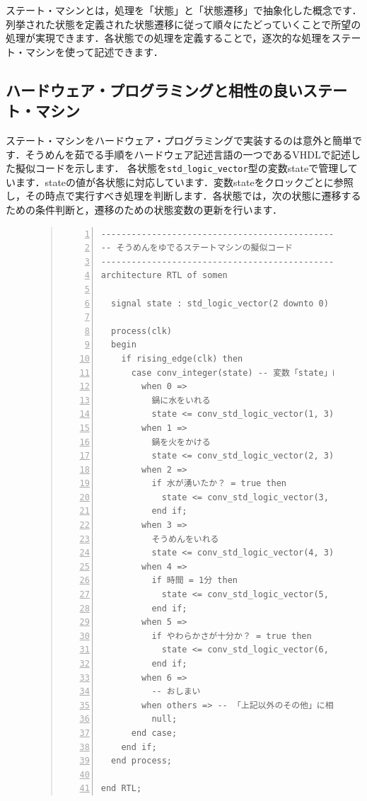 \documentclass[a4paper,dvipdfmx]{jsarticle}
\begin{document}
ステート・マシンとは，処理を「状態」と「状態遷移」で抽象化した概念です．列挙された状態を定義された状態遷移に従って順々にたどっていくことで所望の処理が実現できます．各状態での処理を定義することで，逐次的な処理をステート・マシンを使って記述できます．

\subsection{ハードウェア・プログラミングと相性の良いステート・マシン}
ステート・マシンをハードウェア・プログラミングで実装するのは意外と簡単です．そうめんを茹でる手順をハードウェア記述言語の一つであるVHDLで記述した擬似コードを示します．
各状態を\verb|std_logic_vector|型の変数stateで管理しています．stateの値が各状態に対応しています．変数stateをクロックごとに参照し，その時点で実行すべき処理を判断します．各状態では，次の状態に遷移するための条件判断と，遷移のための状態変数の更新を行います．

\begin{figure}[H]
\begin{quote}
\begin{Verbatim}[frame=single, numbers=left, baselinestretch=0.8]
---------------------------------------------------------
-- そうめんをゆでるステートマシンの擬似コード
---------------------------------------------------------
architecture RTL of somen

  signal state : std_logic_vector(2 downto 0) := (others => '0');

  process(clk)
  begin
    if rising_edge(clk) then
      case conv_integer(state) -- 変数「state」によって状態の場合分けをする
        when 0 =>
          鍋に水をいれる
          state <= conv_std_logic_vector(1, 3);
        when 1 =>
          鍋を火をかける
          state <= conv_std_logic_vector(2, 3);
        when 2 =>
          if 水が湧いたか？ = true then
            state <= conv_std_logic_vector(3, 3);
          end if;
        when 3 =>
          そうめんをいれる
          state <= conv_std_logic_vector(4, 3);
        when 4 =>
          if 時間 = 1分 then
            state <= conv_std_logic_vector(5, 3);
          end if;
        when 5 =>
          if やわらかさが十分か？ = true then
            state <= conv_std_logic_vector(6, 3);
          end if;
        when 6 =>
          -- おしまい
        when others => -- 「上記以外のその他」に相当．これで，全条件を列挙できた．
          null;
      end case; 
    end if;
  end process;

end RTL;
\end{Verbatim}
\end{quote}
\end{figure}
\end{document}
